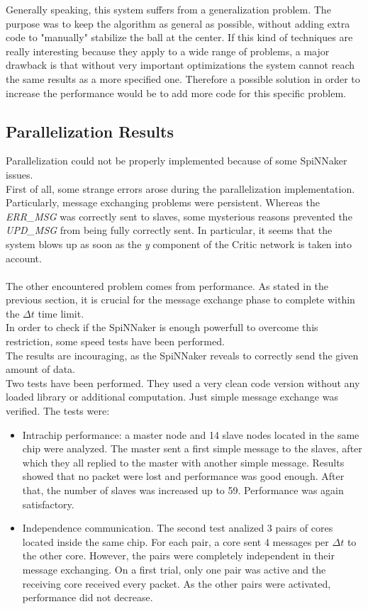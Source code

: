 \documentclass{article}
\begin{document}
Generally speaking, this system suffers from a generalization problem. The purpose was to keep the algorithm as general as possible, without adding extra code to "manually" stabilize the ball at the center. If this kind of techniques are really interesting because they apply to a wide range of problems, a major drawback is that without very important optimizations the system cannot reach the same results as a more specified one. Therefore a possible solution in order to increase the performance would be to add more code for this specific problem.\\


\subsection{Parallelization Results}
Parallelization could not be properly implemented because of some SpiNNaker issues.\\

First of all, some strange errors arose during the parallelization implementation. Particularly, message exchanging problems were persistent. Whereas the \textit{ERR\_MSG} was correctly sent to slaves, some mysterious reasons prevented the \textit{UPD\_MSG} from being fully correctly sent. In particular, it seems that the system blows up as soon as the \textit{y} component of the Critic network is taken into account.\\ \\

The other encountered problem comes from performance. As stated in the previous section, it is crucial for the message exchange phase to complete within the \(\Delta t\) time limit. \\
In order to check if the SpiNNaker is enough powerfull to overcome this restriction, some speed tests have been performed. \\
The results are incouraging, as the SpiNNaker reveals to correctly send the given amount of data. \\
Two tests have been performed. They used a very clean code version without any loaded library or additional computation. Just simple message exchange was verified. The tests were:

\begin{itemize}
\item Intrachip performance: a master node and 14 slave nodes located in the same chip were analyzed. The master sent a first simple message to the slaves, after which they all replied to the master with another simple message. Results showed that no packet were lost and performance was good enough. After that, the number of slaves was increased up to 59. Performance was again satisfactory. 

\item Independence communication. The second test analized 3 pairs of cores located inside the same chip. For each pair, a core sent 4 messages per \(\Delta t\) to the other core. However, the pairs were completely independent in their message exchanging. On a first trial, only one pair was active and the receiving core received every packet. As the other pairs were activated, performance did not decrease.
\end{itemize}
\end{document}
